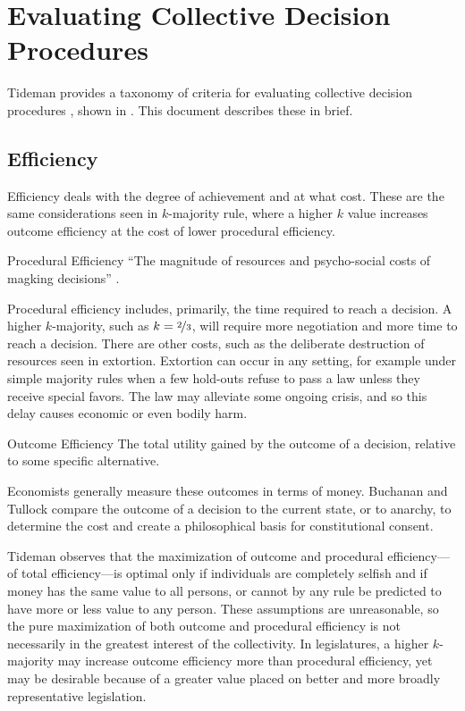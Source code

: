 \chapter{Evaluating Collective Decision Procedures}
\label{apx:evaluating-dm}

Tideman provides a taxonomy of criteria for evaluating collective decision procedures \autocite{Tideman2006}, shown in .  This document describes these in brief.



\section{Efficiency}

Efficiency deals with the degree of achievement and at what cost.  These are the same considerations seen in $k$-majority rule, where a higher $k$ value increases outcome efficiency at the cost of lower procedural efficiency.

\begin{definition}{Procedural Efficiency}
    ``The magnitude of resources and psycho-social costs of magking decisions''  \autocite[36]{Tideman2006}.
\end{definition}

Procedural efficiency includes, primarily, the time required to reach a decision.  A higher $k$-majority, such as $k=\nicefrac{2}{3}$, will require more negotiation and more time to reach a decision.  There are other costs, such as the deliberate destruction of resources seen in extortion.  Extortion can occur in any setting, for example under simple majority rules when a few hold-outs refuse to pass a law unless they receive special favors.  The law may alleviate some ongoing crisis, and so this delay causes economic or even bodily harm.

\begin{definition}{Outcome Efficiency}
    The total utility gained by the outcome of a decision, relative to some specific alternative.
\end{definition}

Economists generally measure these outcomes in terms of money.  Buchanan and Tullock compare the outcome of a decision to the current state, or to anarchy, to determine the cost and create a philosophical basis for constitutional consent.

Tideman observes that the maximization of outcome and procedural efficiency—of total efficiency—is optimal only if individuals are completely selfish and if money has the same value to all persons, or cannot by any rule be predicted to have more or less value to any person.  These assumptions are unreasonable, so the pure maximization of both outcome and procedural efficiency is not necessarily in the greatest interest of the collectivity.  In legislatures, a higher $k$-majority may increase outcome efficiency more than procedural efficiency, yet may be desirable because of a greater value placed on better and more broadly representative legislation.

